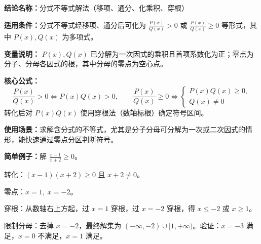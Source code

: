 \textbf{结论名称：}分式不等式解法（移项、通分、化乘积、穿根）

\textbf{适用条件：}分式不等式经移项、通分后可化为 \(\frac{P(x)}{Q(x)}>0\) 或 \(\frac{P(x)}{Q(x)}\ge 0\) 等形式，其中 \(P(x),Q(x)\) 为多项式。

\textbf{变量说明：} \(P(x),Q(x)\) 已分解为一次因式的乘积且首项系数化为正；零点为分子、分母各因式的根，其中分母的零点为空心点。

\textbf{核心公式：}
\[
\boxed{\frac{P(x)}{Q(x)}>0 \iff P(x)Q(x)>0},\qquad 
\boxed{\frac{P(x)}{Q(x)}\ge 0 \iff 
\begin{cases} P(x)Q(x)\ge 0,\\ Q(x)\neq 0 \end{cases}}
\]
转化后对 \(P(x)Q(x)\) 使用穿根法（数轴标根）确定符号区间。

\textbf{使用场景：}求解含分式的不等式，尤其是分子分母可分解为一次或二次因式的情形，能快速通过零点分区判断符号。

\textbf{简单例子：}解 \(\displaystyle\frac{x-1}{x+2}\ge 0\)。

转化：\((x-1)(x+2)\ge 0\) 且 \(x+2\neq 0\)。

零点：\(x=1,\;x=-2\)。

穿根：从数轴右上方起，过 \(x=1\) 穿根，过 \(x=-2\) 穿根，得 \(x\le -2\) 或 \(x\ge 1\)。

限制分母：去掉 \(x=-2\)，最终解集为 \((-\infty,-2)\cup[1,+\infty)\)。验证：\(x=-3\) 满足，\(x=0\) 不满足，\(x=1\) 满足。